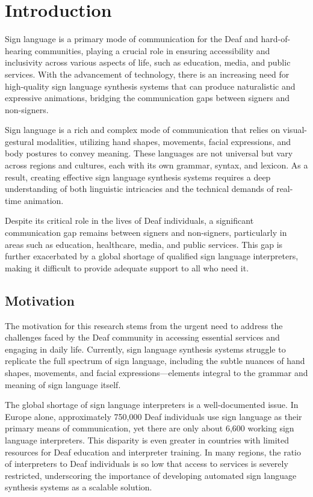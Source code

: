\documentclass[../../main.tex]{subfiles}
\begin{document}
\chapter{Introduction}
\label{ch:introduction}

Sign language is a primary mode of communication for the Deaf and hard-of-hearing communities, playing a crucial role in ensuring accessibility and inclusivity across various aspects of life, such as education, media, and public services. With the advancement of technology, there is an increasing need for high-quality sign language synthesis systems that can produce naturalistic and expressive animations, bridging the communication gaps between signers and non-signers.

Sign language is a rich and complex mode of communication that relies on visual-gestural modalities, utilizing hand shapes, movements, facial expressions, and body postures to convey meaning. These languages are not universal but vary across regions and cultures, each with its own grammar, syntax, and lexicon. As a result, creating effective sign language synthesis systems requires a deep understanding of both linguistic intricacies and the technical demands of real-time animation.

Despite its critical role in the lives of Deaf individuals, a significant communication gap remains between signers and non-signers, particularly in areas such as education, healthcare, media, and public services. This gap is further exacerbated by a global shortage of qualified sign language interpreters, making it difficult to provide adequate support to all who need it.

\section{Motivation}

The motivation for this research stems from the urgent need to address the challenges faced by the Deaf community in accessing essential services and engaging in daily life. Currently, sign language synthesis systems struggle to replicate the full spectrum of sign language, including the subtle nuances of hand shapes, movements, and facial expressions—elements integral to the grammar and meaning of sign language itself.

The global shortage of sign language interpreters is a well-documented issue. In Europe alone, approximately 750,000 Deaf individuals use sign language as their primary means of communication, yet there are only about 6,600 working sign language interpreters. This disparity is even greater in countries with limited resources for Deaf education and interpreter training. In many regions, the ratio of interpreters to Deaf individuals is so low that access to services is severely restricted, underscoring the importance of developing automated sign language synthesis systems as a scalable solution.
\end{document}
